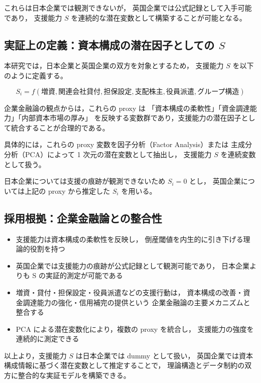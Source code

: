 これらは日本企業では観測できないが，
英国企業では公式記録として入手可能であり，
支援能力 $S$ を連続的な潜在変数として構築することが可能となる。

\subsection{実証上の定義：資本構成の潜在因子としての $S$}

本研究では，日本企業と英国企業の双方を対象とするため，
支援能力 $S$ を以下のように定義する。



\[
S_i = f(\text{増資}, \text{関連会社貸付}, \text{担保設定}, 
       \text{支配株主}, \text{役員派遣}, \text{グループ構造})
\]



企業金融論の観点からは，これらの proxy は
「資本構成の柔軟性」「資金調達能力」「内部資本市場の厚み」
を反映する変数群であり，支援能力の潜在因子として統合することが合理的である。

具体的には，これらの proxy 変数を因子分析（Factor Analysis）または
主成分分析（PCA）によって 1 次元の潜在変数として抽出し，
支援能力 $S$ を連続変数として扱う。

日本企業については支援の痕跡が観測できないため $S_i = 0$ とし，
英国企業については上記の proxy から推定した $S_i$ を用いる。

\subsection{採用根拠：企業金融論との整合性}

\begin{itemize}
    \item 支援能力は資本構成の柔軟性を反映し，
          倒産閾値を内生的に引き下げる理論的役割を持つ
    \item 英国企業では支援能力の痕跡が公式記録として観測可能であり，
          日本企業よりも S の実証的測定が可能である
    \item 増資・貸付・担保設定・役員派遣などの支援行動は，
          資本構成の改善・資金調達能力の強化・信用補完の提供という
          企業金融論の主要メカニズムと整合する
    \item PCA による潜在変数化により，複数の proxy を統合し，
          支援能力の強度を連続的に測定できる
\end{itemize}

以上より，支援能力 $S$ は日本企業では dummy として扱い，
英国企業では資本構成情報に基づく潜在変数として推定することで，
理論構造とデータ制約の双方に整合的な実証モデルを構築できる。


